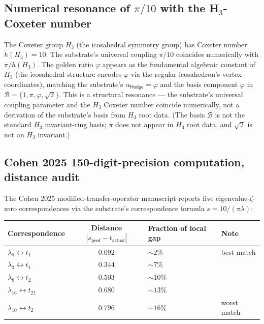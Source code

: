 \documentclass[11pt,a4paper]{amsart}
\theoremstyle{plain}
\theoremstyle{definition}
\begin{document}
\subsection{Numerical resonance of \texorpdfstring{$\pi/10$}{pi/10} with the H\texorpdfstring{$_3$}{3}-Coxeter number}\label{subsec:H3-coxeter-numerical}

The Coxeter group $H_3$ (the icosahedral symmetry group) has Coxeter number $h(H_3) = 10$. The substrate's universal coupling $\pi/10$ coincides numerically with $\pi/h(H_3)$. The golden ratio $\varphi$ appears as the fundamental algebraic constant of $H_3$ (the icosahedral structure encodes $\varphi$ via the regular icosahedron's vertex coordinates), matching the substrate's $\alpha_{\textsf{Hodge}} = \varphi$ and the basis component $\varphi$ in $\mathcal{B} = \{1, \pi, \varphi, \sqrt{2}\}$. This is a structural resonance --- the substrate's universal coupling parameter and the $H_3$ Coxeter number coincide numerically, not a derivation of the substrate's basis from $H_3$ root data. (The basis $\mathcal{B}$ is not the standard $H_3$ invariant-ring basis; $\pi$ does not appear in $H_3$ root data, and $\sqrt{2}$ is not an $H_3$ invariant.)

\subsection{Cohen 2025 150-digit-precision computation, distance audit}\label{subsec:cohen2025-150digit-audit}

The Cohen 2025 modified-transfer-operator manuscript reports five eigenvalue-$\zeta$-zero correspondences via the substrate's correspondence formula $s = 10/(\pi\lambda)$:

\begin{center}
\begin{tabular}{lcll}
\toprule
Correspondence & Distance $|s_{\textsf{pred}} - t_{\textsf{actual}}|$ & Fraction of local gap & Note \\
\midrule
$\lambda_5 \leftrightarrow t_1$ & $0.092$ & $\sim 2\%$ & best match \\
$\lambda_3 \leftrightarrow t_1$ & $0.344$ & $\sim 7\%$ & \\
$\lambda_8 \leftrightarrow t_2$ & $0.503$ & $\sim 10\%$ & \\
$\lambda_{16} \leftrightarrow t_{21}$ & $0.680$ & $\sim 13\%$ & \\
$\lambda_{10} \leftrightarrow t_2$ & $0.796$ & $\sim 16\%$ & worst match \\
\bottomrule
\end{tabular}
\end{center}
\end{document}

